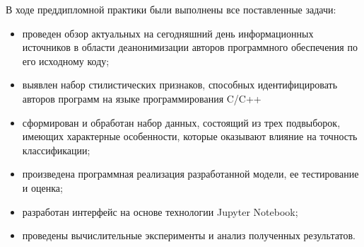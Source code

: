 В ходе преддипломной практики были выполнены все поставленные задачи:
\begin{itemize}
 \item проведен обзор актуальных на сегодняшний день информационных источников в области деанонимизации
 авторов программного обеспечения по его исходному коду;
 \item выявлен набор стилистических признаков, способных идентифицировать авторов программ на языке программирования
 C/C++
 \item сформирован и обработан набор данных, состоящий из трех подвыборок, имеющих характерные особенности,
 которые оказывают влияние на точность классификации;
 \item произведена программная реализация разработанной модели, ее тестирование и оценка;
 \item разработан интерфейс на основе технологии Jupyter Notebook;
 \item проведены вычислительные эксперименты и анализ полученных результатов.
\end{itemize}


